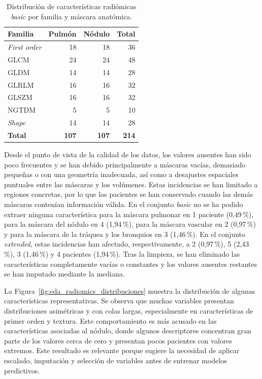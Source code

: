 \begin{table}[!htbp]
    \centering
    \small
    \renewcommand{\arraystretch}{1.15}
    \begin{tabular}{lrrr}
        \hline
        \textbf{Familia} & \textbf{Pulmón} & \textbf{Nódulo} & \textbf{Total} \\
        \hline
        \textit{First order} & 18 & 18 & 36 \\
        GLCM & 24 & 24 & 48 \\
        GLDM & 14 & 14 & 28 \\
        GLRLM & 16 & 16 & 32 \\
        GLSZM & 16 & 16 & 32 \\
        NGTDM & 5 & 5 & 10 \\
        \textit{Shape} & 14 & 14 & 28 \\
        \hline
        \textbf{Total} & \textbf{107} & \textbf{107} & \textbf{214} \\
        \hline
    \end{tabular}
    \caption{Distribución de características radiómicas \textit{basic} por familia y máscara anatómica.}
    \label{tab:familias_radiomicas_basic}
\end{table}

Desde el punto de vista de la calidad de los datos, los valores ausentes han sido poco frecuentes y se han debido principalmente a máscaras vacías, demasiado pequeñas o con una geometría inadecuada, así como a desajustes espaciales puntuales entre las máscaras y los volúmenes. Estas incidencias se han limitado a regiones concretas, por lo que los pacientes se han conservado cuando las demás máscaras contenían información válida. En el conjunto \textit{basic} no se ha podido extraer ninguna característica para la máscara pulmonar en 1 paciente (0,49\,\%), para la máscara del nódulo en 4 (1,94\,\%), para la máscara vascular en 2 (0,97\,\%) y para la máscara de la tráquea y los bronquios en 3 (1,46\,\%). En el conjunto \textit{extended}, estas incidencias han afectado, respectivamente, a 2 (0,97\,\%), 5 (2,43\,\%), 3 (1,46\,\%) y 4 pacientes (1,94\,\%). Tras la limpieza, se han eliminado las características completamente vacías o constantes y los valores ausentes restantes se han imputado mediante la mediana.

La Figura~\ref{fig:eda_radiomics_distribuciones} muestra la distribución de algunas características representativas. Se observa que muchas variables presentan distribuciones asimétricas y con colas largas, especialmente en características de primer orden y textura. Este comportamiento es más acusado en las características asociadas al nódulo, donde algunos descriptores concentran gran parte de los valores cerca de cero y presentan pocos pacientes con valores extremos. Este resultado es relevante porque sugiere la necesidad de aplicar escalado, imputación y selección de variables antes de entrenar modelos predictivos.

